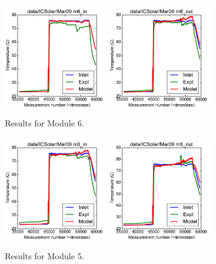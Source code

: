 \documentclass{article}
\begin{document}
\begin{figure}[!ht]
\centering
\includegraphics[width=0.4\textwidth]{../../data/ICSolar/images/Mar09_m6_in_unsteady.pdf}\hspace{0.05\textwidth}
\includegraphics[width=0.4\textwidth]{../../data/ICSolar/images/Mar09_m6_out_unsteady.pdf}\hspace{0.05\textwidth}\\
\caption{Results for Module 6.}\end{figure}
\begin{figure}[!ht]
\centering
\includegraphics[width=0.4\textwidth]{../../data/ICSolar/images/Mar09_m5_in_unsteady.pdf}\hspace{0.05\textwidth}
\includegraphics[width=0.4\textwidth]{../../data/ICSolar/images/Mar09_m5_out_unsteady.pdf}\hspace{0.05\textwidth}\\
\caption{Results for Module 5.}\end{figure}
\end{document}

